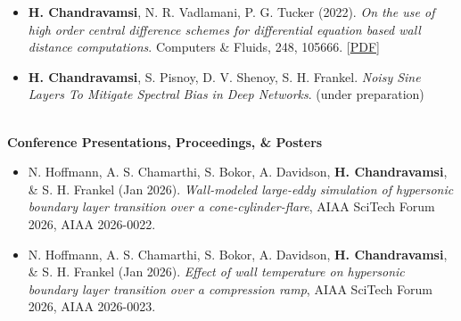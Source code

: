 \begin{itemize}[itemsep=0pt, topsep=0pt, label=]
    \item \textbf{H. Chandravamsi}, N. R. Vadlamani, P. G. Tucker (2022). \textit{On the use of high order central difference schemes for differential equation based wall distance computations}. Computers \& Fluids, 248, 105666. [\href{https://arxiv.org/pdf/2111.09859}{PDF}]
\end{itemize}


{\color{gray}
\begin{itemize}[itemsep=0pt, topsep=5pt, label=]
    \item \textbf{H. Chandravamsi}, S. Pisnoy, D. V. Shenoy, S. H. Frankel. \textit{Noisy Sine Layers To Mitigate Spectral Bias in Deep Networks}. (under preparation)
\end{itemize}
}



\ \\[0mm]
\noindent \textbf{\textbf{Conference Presentations, Proceedings, \& Posters}}

\begin{itemize}[itemsep=0pt, topsep=5pt, label=]
    \item N. Hoffmann, A. S. Chamarthi, S. Bokor, A. Davidson, \textbf{H. Chandravamsi}, \& S. H. Frankel (Jan 2026). \textit{Wall-modeled large-eddy simulation of hypersonic boundary layer transition over a cone-cylinder-flare}, AIAA SciTech Forum 2026, AIAA 2026-0022.
\end{itemize}

\begin{itemize}[itemsep=0pt, topsep=5pt, label=]
    \item N. Hoffmann, A. S. Chamarthi, S. Bokor, A. Davidson, \textbf{H. Chandravamsi}, \& S. H. Frankel (Jan 2026). \textit{Effect of wall temperature on hypersonic boundary layer transition over a compression ramp}, AIAA SciTech Forum 2026, AIAA 2026-0023.
\end{itemize}

